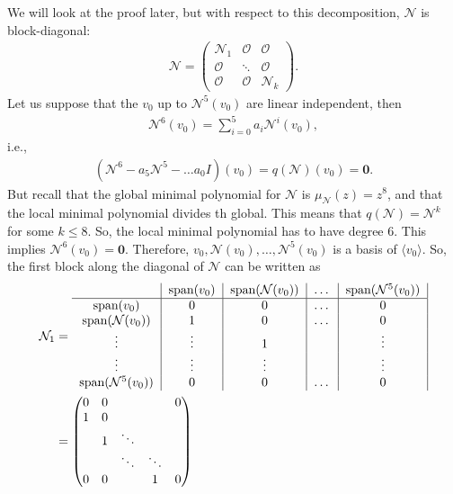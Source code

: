 \documentclass{book}
\theoremstyle{definition}
\newcommand{\xpan}{\text{span}}
\begin{document}
We will look at the proof later, but with respect to this decomposition, $\mathcal{N}$ is block-diagonal:
\begin{align*}
\mathcal{N}= \begin{pmatrix}
\mathcal{N}_1 & \mathcal{O} & \mathcal{O}\\
\mathcal{O}& \ddots & \mathcal{O}\\
\mathcal{O} & \mathcal{O} & \mathcal{N}_k
\end{pmatrix}.
\end{align*}
Let us suppose that the $v_0$ up to $\mathcal{N}^5(v_0)$ are linear independent, then 
\begin{align*}
\mathcal{N}^6(v_0) = \sum^5_{i=0}a_i \mathcal{N}^i (v_0),
\end{align*}
i.e.,
\begin{align*}
(\mathcal{N}^6 - a_5\mathcal{N}^5 - \dots a_0 I)(v_0) =  q(\mathcal{N})(v_0)  = \mathbf{0}.
\end{align*}
But recall that the global minimal polynomial for $\mathcal{N}$ is $\mu_\mathcal{N}(z) = z^8$, and that the local minimal polynomial divides th global. This means that $q(\mathcal{N}) = \mathcal{N}^k$ for some $k \leq 8$. So, the local minimal polynomial has to have degree 6. This implies $\mathcal{N}^6(v_0) = \mathbf{0}$. Therefore, $v_0 ,\mathcal{N}(v_0),\dots , \mathcal{N}^5(v_0)$ is a basis of $\langle v_0 \rangle$. So, the first block along the diagonal of $\mathcal{N}$ can be written as 
\begin{align*}
\mathcal{N}_1 &= 
\begin{tabular}{c|c|c|c|c|}
& $\xpan(v_0)$ & $\xpan(\mathcal{N}(v_0))$ & \dots & $\xpan(\mathcal{N}^5(v_0))$\\
\hline
$\xpan(v_0)$& $0$ & $0$  & \dots & 0\\	
$\xpan(\mathcal{N}(v_0))$& $1$ & $0$ &\dots& $0$\\
$\vdots$ &\vdots&1&&\vdots \\
$\vdots$ &\vdots&\vdots&& \vdots\\
$\xpan(\mathcal{N}^5(v_0))$ &0 &0 & \dots& 0
\end{tabular}\\
&= \begin{pmatrix}
0 & 0 &  && 0\\
1 & 0 &  && \\
 & 1 & \ddots && \\
 &  & \ddots &\ddots&\\
0 & 0 &  &1& 0
\end{pmatrix}
\end{align*}
\end{document}
